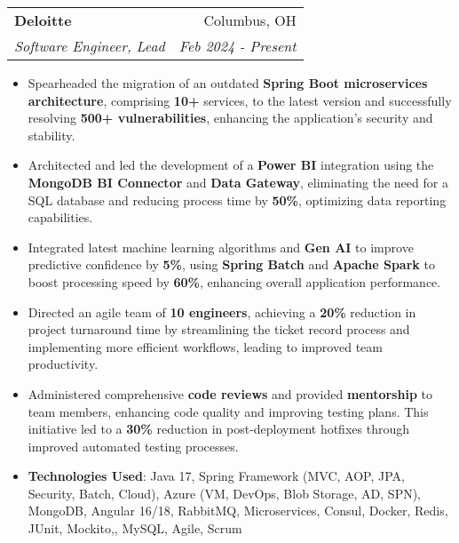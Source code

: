 \documentclass[letterpaper,11pt]{article}
\makeatletter
\newcommand{\resumeItem}[2]{
  \item\small{
    \textbf{#1}#2 \vspace{-2pt}
  }
}
\newcommand{\resumeSubheading}[4]{
  \vspace{-1pt}\item
    \begin{tabular*}{0.97\textwidth}[t]{l@{\extracolsep{\fill}}r}
      \textbf{#1} & #2 \\
      \textit{\small#3} & \textit{\small #4} \\
    \end{tabular*}\vspace{-5pt}
}
\newcommand{\resumeItemListStart}{\begin{itemize}}
\newcommand{\resumeItemListEnd}{\end{itemize}\vspace{-5pt}}
\makeatother
\begin{document}
    \resumeSubheading
    {Deloitte}{Columbus, OH}
    {Software Engineer, Lead}{Feb 2024 - Present}
    \resumeItemListStart
      \resumeItem{}
        {Spearheaded the migration of an outdated \textbf{Spring Boot microservices architecture}, comprising \textbf{10+} services, to the latest version and successfully resolving \textbf{500+ vulnerabilities}, enhancing the application's security and stability.}
      \resumeItem{}
        {Architected and led the development of a \textbf{Power BI} integration using the \textbf{MongoDB BI Connector} and \textbf{Data Gateway}, eliminating the need for a SQL database and reducing process time by \textbf{50\%}, optimizing data reporting capabilities.}
      \resumeItem{}
        {Integrated latest machine learning algorithms and \textbf{Gen AI} to improve predictive confidence by \textbf{5\%}, using \textbf{Spring Batch} and \textbf{Apache Spark} to boost processing speed by \textbf{60\%}, enhancing overall application performance.}
      \resumeItem{}
        {Directed an agile team of \textbf{10 engineers}, achieving a \textbf{20\%} reduction in project turnaround time by streamlining the ticket record process and implementing more efficient workflows, leading to improved team productivity.}
      \resumeItem{}
        {Administered comprehensive \textbf{code reviews} and provided \textbf{mentorship} to team members, enhancing code quality and improving testing plans. This initiative led to a \textbf{30\%} reduction in post-deployment hotfixes through improved automated testing processes.}
      \resumeItem{Technologies Used}
        {: Java 17, Spring Framework (MVC, AOP, JPA, Security, Batch, Cloud), Azure (VM, DevOps, Blob Storage, AD, SPN), MongoDB, Angular 16/18, RabbitMQ, Microservices, Consul, Docker, Redis, JUnit, Mockito,, MySQL, Agile, Scrum}
    \resumeItemListEnd
\end{document}
